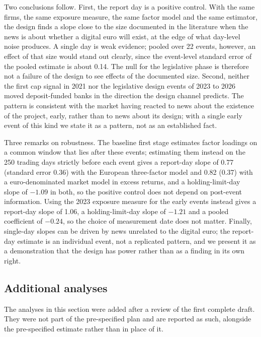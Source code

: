 \documentclass[11pt]{article}
\theoremstyle{plain}\newtheorem{proposition}{Proposition}
\begin{document}
Two conclusions follow. First, the report day is a positive control. With the same firms, the same exposure measure, the same factor model and the same estimator, the design finds a slope close to the size documented in the literature when the news is about whether a digital euro will exist, at the edge of what day-level noise produces. A single day is weak evidence; pooled over 22 events, however, an effect of that size would stand out clearly, since the event-level standard error of the pooled estimate is about 0.14. The null for the legislative phase is therefore not a failure of the design to see effects of the documented size. Second, neither the first cap signal in 2021 nor the legislative design events of 2023 to 2026 moved deposit-funded banks in the direction the design channel predicts. The pattern is consistent with the market having reacted to news about the existence of the project, early, rather than to news about its design; with a single early event of this kind we state it as a pattern, not as an established fact.

Three remarks on robustness. The baseline first stage estimates factor loadings on a common window that lies after these events; estimating them instead on the 250 trading days strictly before each event gives a report-day slope of 0.77 (standard error 0.36) with the European three-factor model and 0.82 (0.37) with a euro-denominated market model in excess returns, and a holding-limit-day slope of $-1.09$ in both, so the positive control does not depend on post-event information. Using the 2023 exposure measure for the early events instead gives a report-day slope of 1.06, a holding-limit-day slope of $-1.21$ and a pooled coefficient of $-0.24$, so the choice of measurement date does not matter. Finally, single-day slopes can be driven by news unrelated to the digital euro; the report-day estimate is an individual event, not a replicated pattern, and we present it as a demonstration that the design has power rather than as a finding in its own right.

\subsection{Additional analyses}\label{sec:referee}

The analyses in this section were added after a review of the first complete draft. They were not part of the pre-specified plan and are reported as such, alongside the pre-specified estimate rather than in place of it.
\end{document}
